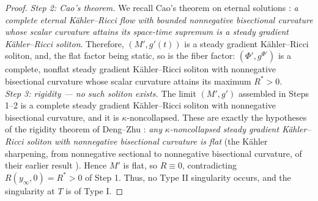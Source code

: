 \documentclass[11pt]{amsart}
\theoremstyle{plain}
\numberwithin{equation}{section}
\theoremstyle{definition}
\theoremstyle{remark}
\begin{document}
\begin{proof}
	\emph{Step 2: Cao's theorem.} We recall Cao's theorem on eternal solutions \cite{Cao97}: \emph{a complete eternal Kähler--Ricci flow with bounded nonnegative bisectional curvature whose scalar curvature attains its space-time supremum is a steady gradient Kähler--Ricci soliton}. Therefore, $( M', g' (t) )$ is a steady gradient Kähler--Ricci soliton, and, the flat factor being static, so is the fiber factor: $( \Phi', g^{\Phi'} )$ is a complete, nonflat steady gradient Kähler--Ricci soliton with nonnegative bisectional curvature whose scalar curvature attains its maximum $R^* > 0$.\\ %
	
	\emph{Step 3: rigidity --- no such soliton exists.} The limit $( M', g' )$ assembled in Steps 1--2 is a complete steady gradient Kähler--Ricci soliton with nonnegative bisectional curvature, and it is $\kappa$-noncollapsed. %
	These are exactly the hypotheses of the rigidity theorem of Deng--Zhu \cite{DZ20}: \emph{any }$\kappa$\emph{-noncollapsed steady gradient Kähler--Ricci soliton with nonnegative bisectional curvature is flat} (the Kähler sharpening, from nonnegative sectional to nonnegative bisectional curvature, of their earlier result \cite{DZ18}). %
	Hence $M'$ is flat, so $R \equiv 0$, contradicting $R ( y_\infty, 0 ) = R^* > 0$ of Step 1. Thus, no Type II singularity occurs, and the singularity at $T$ is of Type I.
\end{proof}
\end{document}
